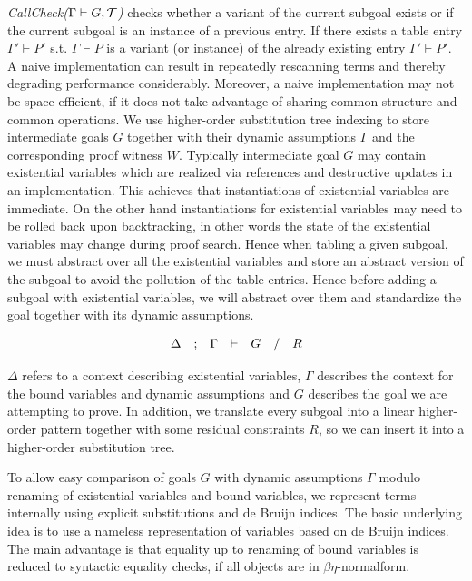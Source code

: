 \documentclass{acmconf}
\newcommand{\vd}{\vdash}
\begin{document}
{\em{CallCheck($\Gamma \vd G, \cal{T}$)}} checks whether a variant of
the current subgoal exists or if the current subgoal is an instance of
a previous entry. If there exists a table entry $\Gamma' \vd P'$
s.t. $\Gamma \vd P$ is a variant (or instance) of the already existing
entry $\Gamma' \vd P'$. A naive implementation can result in
repeatedly rescanning terms and thereby degrading performance
considerably. Moreover, a naive implementation may not be space
efficient, if it does not take advantage of sharing common structure
and common operations. We use higher-order substitution tree indexing
to store intermediate goals $G$ together with their dynamic
assumptions $\Gamma$ and the corresponding proof witness
$W$. Typically intermediate goal $G$ may contain existential
variables which are realized via references and destructive updates in
an implementation. This achieves that instantiations of existential variables
are immediate. On the other hand instantiations for existential
variables may need to be rolled back upon backtracking, in other words
the state of the existential variables may change during proof search.
Hence when tabling a given subgoal, we must abstract over all the
existential variables and store an abstract version of the
subgoal to avoid the pollution of the table entries.
Hence before adding a subgoal with existential variables, we will
abstract over them and standardize the goal together with its dynamic
assumptions. 

\[
\begin{array}{lclclcl}
\multicolumn{1}{c}{\Delta} & ; & \multicolumn{1}{c}{\Gamma} & \vd &
\multicolumn{1}{c}{G}
& / & \multicolumn{1}{c}{R}\\
 \end{array}
\]

$\Delta$ refers to a context describing existential variables,
$\Gamma$ describes the context for the bound variables  and dynamic
assumptions and $G$ describes the goal we are attempting to prove. 
In addition, we translate every subgoal into a linear higher-order pattern
together with some residual constraints $R$, so we can insert it into a
higher-order substitution tree.

To allow easy comparison of goals $G$ with dynamic assumptions
$\Gamma$ modulo renaming of existential variables and bound variables, we
represent terms internally using explicit substitutions
\cite{Abadi:POPL90} and de Bruijn indices. The basic underlying idea
is to use a nameless representation of variables based on de Bruijn
indices. The main advantage is that equality up to renaming
of bound variables is reduced to syntactic equality checks, if all
objects are in $\beta\eta$-normalform.
\end{document}
